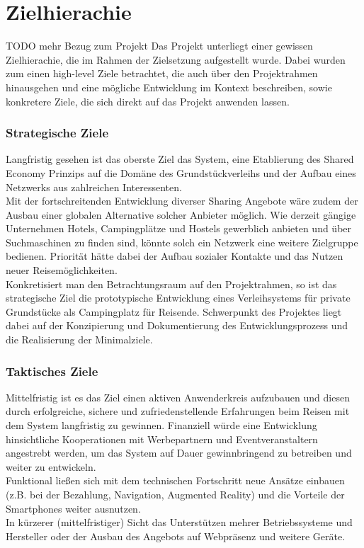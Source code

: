 
\section{Zielhierachie}

TODO mehr Bezug zum Projekt
Das Projekt unterliegt einer gewissen Zielhierachie, die im Rahmen der Zielsetzung aufgestellt wurde. Dabei wurden zum einen high-level Ziele betrachtet, die auch über den Projektrahmen hinausgehen und eine mögliche Entwicklung im Kontext beschreiben, sowie konkretere Ziele, die sich direkt auf das Projekt anwenden lassen.


\subsubsection{Strategische Ziele}
Langfristig gesehen ist das oberste Ziel das System, eine Etablierung des Shared Economy Prinzips auf die Domäne des Grundstückverleihs und der Aufbau eines Netzwerks aus zahlreichen Interessenten.\\
Mit der fortschreitenden Entwicklung diverser Sharing Angebote wäre zudem der Ausbau einer globalen Alternative solcher Anbieter möglich. Wie derzeit gängige Unternehmen Hotels, Campingplätze und Hostels gewerblich anbieten und über Suchmaschinen zu finden sind, könnte solch ein Netzwerk eine weitere Zielgruppe bedienen. Priorität hätte dabei der Aufbau sozialer Kontakte und das Nutzen neuer Reisemöglichkeiten.\\

Konkretisiert man den Betrachtungsraum auf den Projektrahmen, so ist das strategische Ziel die prototypische Entwicklung eines Verleihsystems für private Grundstücke als Campingplatz für Reisende. Schwerpunkt des Projektes liegt dabei auf der Konzipierung und Dokumentierung des Entwicklungsprozess und die Realisierung der Minimalziele.\\


\subsubsection{Taktisches Ziele}
Mittelfristig ist es das Ziel einen aktiven Anwenderkreis aufzubauen und diesen durch erfolgreiche, sichere und zufriedenstellende Erfahrungen beim Reisen mit dem System langfristig zu gewinnen.
Finanziell würde eine Entwicklung hinsichtliche Kooperationen mit Werbepartnern und Eventveranstaltern angestrebt werden, um das System auf Dauer gewinnbringend zu betreiben und weiter zu entwickeln. \\
Funktional ließen sich mit dem technischen Fortschritt neue Ansätze einbauen (z.B. bei der Bezahlung, Navigation, Augmented Reality) und die Vorteile der Smartphones weiter ausnutzen. \\
In kürzerer (mittelfristiger) Sicht das Unterstützen mehrer Betriebssysteme und Hersteller oder der Ausbau des Angebots auf Webpräsenz und weitere Geräte.\\

